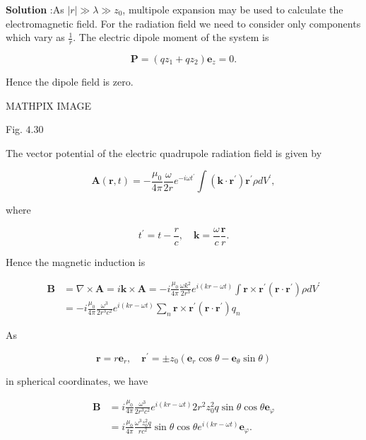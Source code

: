 \documentclass[10pt]{article}
\begin{document}
\textbf{Solution} :As $|r| \gg \lambda \gg z_{0}$, multipole expansion may be used to calculate the electromagnetic field. For the radiation field we need to consider only components which vary as $\frac{1}{r}$. The electric dipole moment of the system is

$$
\mathbf{P}=\left(q z_{1}+q z_{2}\right) \mathbf{e}_{z}=0 .
$$

Hence the dipole field is zero.

MATHPIX IMAGE

Fig. $4.30$

The vector potential of the electric quadrupole radiation field is given by

$$
\mathbf{A}(\mathbf{r}, t)=-\frac{\mu_{0}}{4 \pi} \frac{\omega}{2 r} e^{-i \omega t^{\prime}} \int\left(\mathbf{k} \cdot \mathbf{r}^{\prime}\right) \mathbf{r}^{\prime} \rho d V^{\prime},
$$

where

$$
t^{\prime}=t-\frac{r}{c}, \quad \mathbf{k}=\frac{\omega}{c} \frac{\mathbf{r}}{r} .
$$



Hence the magnetic induction is

$$
\begin{aligned}
\mathbf{B} &=\nabla \times \mathbf{A}=i \mathbf{k} \times \mathbf{A}=-i \frac{\mu_{0}}{4 \pi} \frac{\omega k^{2}}{2 r^{3}} e^{i(k r-\omega t)} \int \mathbf{r} \times \mathbf{r}^{\prime}\left(\mathbf{r} \cdot \mathbf{r}^{\prime}\right) \rho d V^{\prime} \\
&=-i \frac{\mu_{0}}{4 \pi} \frac{\omega^{3}}{2 r^{3} c^{2}} e^{i(k r-\omega t)} \sum_{n} \mathbf{r} \times \mathbf{r}^{\prime}\left(\mathbf{r} \cdot \mathbf{r}^{\prime}\right) q_{n}
\end{aligned}
$$

As

$$
\mathbf{r}=r \mathbf{e}_{r}, \quad \mathbf{r}^{\prime}=\pm z_{0}\left(\mathbf{e}_{r} \cos \theta-\mathbf{e}_{\theta} \sin \theta\right)
$$

in spherical coordinates, we have

$$
\begin{aligned}
\mathbf{B} &=i \frac{\mu_{0}}{4 \pi} \frac{\omega^{3}}{2 r^{3} c^{2}} e^{i(k r-\omega t)} 2 r^{2} z_{0}^{2} q \sin \theta \cos \theta \mathbf{e}_{\varphi} \\
&=i \frac{\mu_{0}}{4 \pi} \frac{\omega^{3} z_{0}^{2} q}{r c^{2}} \sin \theta \cos \theta e^{i(k r-\omega t)} \mathbf{e}_{\varphi} .
\end{aligned}
$$
\end{document}
